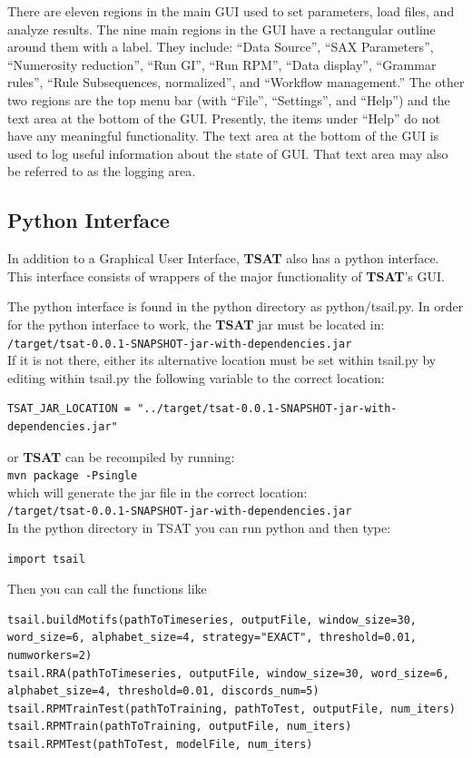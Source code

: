 \documentclass[letterpaper, 12pt]{article}
\newcommand\TSAT{\textbf{TSAT}}
\begin{document}
There are eleven regions in the main GUI used to set parameters, load files, and analyze results.  The nine main regions in the GUI have a rectangular outline around them with a label.  They include: ``Data Source'', ``SAX Parameters'', ``Numerosity reduction'', ``Run GI'', ``Run RPM'', ``Data display'', ``Grammar rules'', ``Rule Subsequences, normalized'', and ``Workflow management.''  The other two regions are the top menu bar (with ``File'', ``Settings'', and ``Help'') and the text area at the bottom of the GUI.  Presently, the items under ``Help'' do not have any meaningful functionality.  The text area at the bottom of the GUI is used to log useful information about the state of GUI.  That text area may also be referred to as the logging area.

\subsection{Python Interface}
In addition to a Graphical User Interface, {\TSAT} also has a python interface.  This interface consists of wrappers of the major functionality of {\TSAT}'s GUI. 

The python interface is found in the python directory as python/tsail.py.  In order for the python interface to work, the {\TSAT} jar must be located in:\\ \texttt{/target/tsat-0.0.1-SNAPSHOT-jar-with-dependencies.jar}\\
If it is not there, either its alternative location must be set within tsail.py by editing within tsail.py the following variable to the correct location:
\begin{lstlisting}
TSAT_JAR_LOCATION = "../target/tsat-0.0.1-SNAPSHOT-jar-with-dependencies.jar"
\end{lstlisting} 
or {\TSAT} can be recompiled by running:\\
\noindent\texttt{mvn package -Psingle}\\
which will generate the jar file in the correct location:\\
\texttt{/target/tsat-0.0.1-SNAPSHOT-jar-with-dependencies.jar}\\
In the python directory in TSAT you can run python and then type:
\begin{lstlisting}
import tsail
\end{lstlisting}

Then you can call the functions like
\begin{lstlisting}
tsail.buildMotifs(pathToTimeseries, outputFile, window_size=30, word_size=6, alphabet_size=4, strategy="EXACT", threshold=0.01, numworkers=2)
tsail.RRA(pathToTimeseries, outputFile, window_size=30, word_size=6, alphabet_size=4, threshold=0.01, discords_num=5)
tsail.RPMTrainTest(pathToTraining, pathToTest, outputFile, num_iters)
tsail.RPMTrain(pathToTraining, outputFile, num_iters)
tsail.RPMTest(pathToTest, modelFile, num_iters)
\end{lstlisting}
\end{document}
